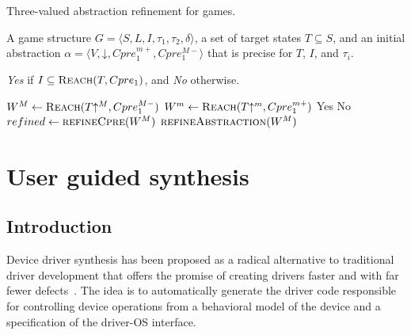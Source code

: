 \documentclass{book}
\newcommand{\reach}[0]{\textsc{Reach}}
\newcommand{\concrete}[1]{#1\mathord{\downarrow}}
\newcommand{\abstractm}[1]{#1\mathord{\uparrow^m}}
\newcommand{\abstractM}[1]{#1\mathord{\uparrow^M}}
\theoremstyle{definition}
\begin{document}
%

\begin{algorithm}
\caption{Three-valued abstraction refinement for games.}
\label{alg:generic}

\begin{algorithmic}[1]

     A game structure $G = \langle S, L, I, \tau_1, \tau_2, \delta \rangle$, a set 
    of target states $T\subseteq S$, and an initial abstraction $\alpha=\langle V, \concrete{}, Cpre_1^{m+}, Cpre_1^{M-} \rangle$
    that is precise for $T$, $I$, and $\tau_i$.

     {\it Yes} if $I \subseteq \reach(T, Cpre_1)$, and {\it No} otherwise.

    \Loop
        \State $W^M \gets \reach(\abstractM{T}, Cpre_1^{M-})$
        \State $W^m \gets \reach(\abstractm{T}, Cpre_1^{m+})$
        \If{$\abstractM{I} \subseteq W^M$} 
            \State\Return Yes
        \ElsIf{$\abstractM{I} \nsubseteq W^m$} 
            \State\Return No
        \Else       
            \State $refined \gets \Call{refineCpre}{W^M}$
                \State$\Call{refineAbstraction}{W^M}$
            \EndIf
        \EndIf
    \EndLoop
\end{algorithmic}
\end{algorithm}

\chapter{User guided synthesis}

\section{Introduction}\label{sec:user_guided_intro}

Device driver synthesis has been proposed as a radical alternative to traditional driver development that offers the promise of creating drivers faster and with far fewer defects~\cite{Ryzhyk_CKSH_09}. The idea is to automatically generate the driver code responsible for controlling device operations from a behavioral model of the device and a specification of the driver-OS interface.
\end{document}
